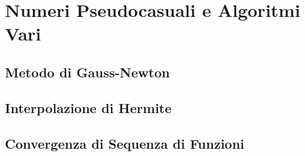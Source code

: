 \chapter{Numeri Pseudocasuali e Algoritmi Vari}\label{appendixC}
\section{Metodo di Gauss-Newton}\label{appendixC:gaussNewton}
\section{Interpolazione di Hermite}\label{appendixC:hermiteInterp}
\section{Convergenza di Sequenza di Funzioni}\label{appendixC:functionSeqConvergence}

